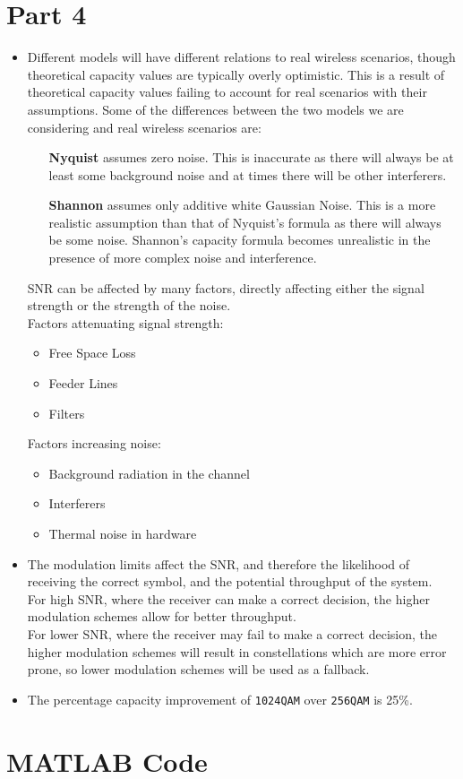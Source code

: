\documentclass[A4]{article}
\begin{document}
\section*{Part 4}

\begin{itemize}
	\item
		Different models will have different relations to real wireless scenarios, though theoretical capacity values are typically overly optimistic.
		This is a result of theoretical capacity values failing to account for real scenarios with their assumptions.
		Some of the differences between the two models we are considering and real wireless scenarios are:
		\begin{enumerate}
			\item[\textbf{Nyquist}]
				assumes zero noise.
				This is inaccurate as there will always be at least some background noise and at times there will be other interferers.
			\item[\textbf{Shannon}]
				assumes only additive white Gaussian Noise.
				This is a more realistic assumption than that of Nyquist's formula as there will always be some noise.
				Shannon's capacity formula becomes unrealistic in the presence of more complex noise and interference.
		\end{enumerate}

		SNR can be affected by many factors, directly affecting either the signal strength or the strength of the noise.\\

		Factors attenuating signal strength:

		\begin{itemize}
			\item
				Free Space Loss
			\item
				Feeder Lines
			\item
				Filters
		\end{itemize}
		
		Factors increasing noise:
		
		\begin{itemize}
			\item
				Background radiation in the channel
			\item
				Interferers
			\item
				Thermal noise in hardware
		\end{itemize}

	\item
		The modulation limits affect the SNR, and therefore the likelihood of receiving the correct symbol, and the potential throughput of the system.\\
		For high SNR, where the receiver can make a correct decision, the higher modulation schemes allow for better throughput.\\
		For lower SNR, where the receiver may fail to make a correct decision, the higher modulation schemes will result in constellations which are more error prone, so lower modulation schemes will be used as a fallback.
	\item
		The percentage capacity improvement of \texttt{1024QAM} over \texttt{256QAM} is 25\%.
\end{itemize}

\newpage
\section*{MATLAB Code}

\end{document}
